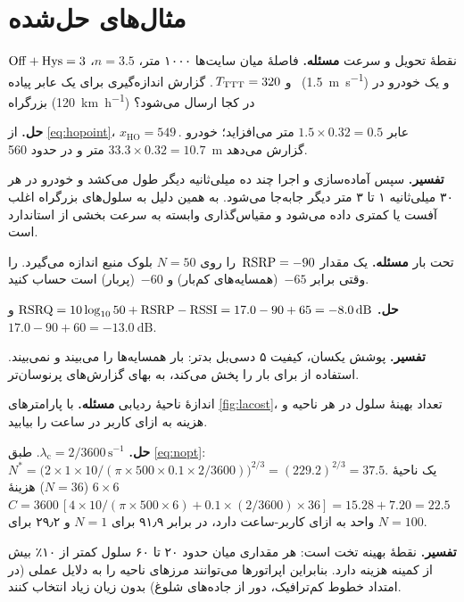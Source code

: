 \documentclass[11pt,a4paper]{article}
\begin{document}
\section{مثال‌های حل‌شده}

\begin{examplebox}{نقطهٔ تحویل و سرعت}\label{ex:hopoint}
\textbf{مسئله.} فاصلهٔ میان سایت‌ها ۱۰۰۰ متر، $n=3.5$، $\mathrm{Off}+\mathrm{Hys} = 3$\, و
$T_{\mathrm{TTT}} = 320$\,. گزارش اندازه‌گیری برای یک عابر پیاده (\qty{1.5}{\metre\per\second}) و یک خودرو در
بزرگراه (\qty{120}{\kilo\metre\per\hour}) در کجا ارسال می‌شود؟

\textbf{حل.} از \cref{eq:hopoint}، $x_{\mathrm{HO}} = 549$\,. عابر $1.5\times0.32 = 0.5$ متر
می‌افزاید؛ خودرو $33.3\times0.32 = 10.7$ متر و در حدود \qty{560}{\metre} گزارش می‌دهد.

\textbf{تفسیر.} سپس آماده‌سازی و اجرا چند ده میلی‌ثانیه دیگر طول می‌کشد و خودرو در هر ۳۰ میلی‌ثانیه
۱ تا ۳ متر دیگر جابه‌جا می‌شود. به همین دلیل به سلول‌های بزرگراه اغلب آفست یا  کمتری داده
می‌شود و مقیاس‌گذاری  وابسته به سرعت بخشی از استاندارد است.
\end{examplebox}

\begin{examplebox}{ تحت بار}\label{ex:rsrq}
\textbf{مسئله.} یک  مقدار $\mathrm{RSRP}=-90$\, را روی $N=50$ بلوک منبع اندازه می‌گیرد. 
را وقتی  برابر $-65$\, (همسایه‌های کم‌بار) و $-60$\, (پربار) است حساب کنید.

\textbf{حل.} $\RSRQ = 10\log_{10}50 + \RSRP - \RSSI = 17.0 - 90 + 65 = \qty{-8.0}{\dB}$ و
$17.0 - 90 + 60 = \qty{-13.0}{\dB}$.

\textbf{تفسیر.} پوشش یکسان، کیفیت ۵ دسی‌بل بدتر:  بار همسایه‌ها را می‌بیند و 
نمی‌بیند. استفاده از  برای  بار را پخش می‌کند، به بهای گزارش‌های پرنوسان‌تر.
\end{examplebox}

\begin{examplebox}{اندازهٔ ناحیهٔ ردیابی}\label{ex:la}
\textbf{مسئله.} با پارامترهای \cref{fig:lacost}، تعداد بهینهٔ سلول در هر ناحیه و هزینه به ازای کاربر
در ساعت را بیابید.

\textbf{حل.} $\lambda_\mathrm{c} = 2/3600\,\mathrm{s}^{-1}$. طبق \cref{eq:nopt}:
$N^\ast = \bigl(2\times1\times10/(\pi\times500\times0.1\times2/3600)\bigr)^{2/3} = (229.2)^{2/3} = 37.5$.
یک ناحیهٔ $6\times6$ ($N=36$) هزینهٔ $C = 3600\,[4\times10/(\pi\times500\times6) + 0.1\times(2/3600)\times36]
= 15.28 + 7.20 = 22.5$ واحد به ازای کاربر-ساعت دارد، در برابر ۹۱٫۹ برای $N=1$ و ۲۹٫۲ برای $N=100$.

\textbf{تفسیر.} نقطهٔ بهینه تخت است: هر مقداری میان حدود ۲۰ تا ۶۰ سلول کمتر از ۱۰٪ بیش از کمینه
هزینه دارد. بنابراین اپراتورها می‌توانند مرزهای ناحیه را به دلایل عملی (در امتداد خطوط کم‌ترافیک،
دور از جاده‌های شلوغ) بدون زیان زیاد انتخاب کنند.
\end{examplebox}
\end{document}
